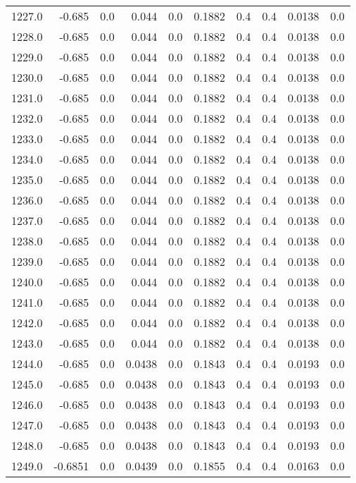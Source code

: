 \begin{longtable}{lrrrrrrrrr}
1227.0 & -0.685 & 0.0 & 0.044 & 0.0 & 0.1882 & 0.4 & 0.4 & 0.0138 & 0.0 \\
1228.0 & -0.685 & 0.0 & 0.044 & 0.0 & 0.1882 & 0.4 & 0.4 & 0.0138 & 0.0 \\
1229.0 & -0.685 & 0.0 & 0.044 & 0.0 & 0.1882 & 0.4 & 0.4 & 0.0138 & 0.0 \\
1230.0 & -0.685 & 0.0 & 0.044 & 0.0 & 0.1882 & 0.4 & 0.4 & 0.0138 & 0.0 \\
1231.0 & -0.685 & 0.0 & 0.044 & 0.0 & 0.1882 & 0.4 & 0.4 & 0.0138 & 0.0 \\
1232.0 & -0.685 & 0.0 & 0.044 & 0.0 & 0.1882 & 0.4 & 0.4 & 0.0138 & 0.0 \\
1233.0 & -0.685 & 0.0 & 0.044 & 0.0 & 0.1882 & 0.4 & 0.4 & 0.0138 & 0.0 \\
1234.0 & -0.685 & 0.0 & 0.044 & 0.0 & 0.1882 & 0.4 & 0.4 & 0.0138 & 0.0 \\
1235.0 & -0.685 & 0.0 & 0.044 & 0.0 & 0.1882 & 0.4 & 0.4 & 0.0138 & 0.0 \\
1236.0 & -0.685 & 0.0 & 0.044 & 0.0 & 0.1882 & 0.4 & 0.4 & 0.0138 & 0.0 \\
1237.0 & -0.685 & 0.0 & 0.044 & 0.0 & 0.1882 & 0.4 & 0.4 & 0.0138 & 0.0 \\
1238.0 & -0.685 & 0.0 & 0.044 & 0.0 & 0.1882 & 0.4 & 0.4 & 0.0138 & 0.0 \\
1239.0 & -0.685 & 0.0 & 0.044 & 0.0 & 0.1882 & 0.4 & 0.4 & 0.0138 & 0.0 \\
1240.0 & -0.685 & 0.0 & 0.044 & 0.0 & 0.1882 & 0.4 & 0.4 & 0.0138 & 0.0 \\
1241.0 & -0.685 & 0.0 & 0.044 & 0.0 & 0.1882 & 0.4 & 0.4 & 0.0138 & 0.0 \\
1242.0 & -0.685 & 0.0 & 0.044 & 0.0 & 0.1882 & 0.4 & 0.4 & 0.0138 & 0.0 \\
1243.0 & -0.685 & 0.0 & 0.044 & 0.0 & 0.1882 & 0.4 & 0.4 & 0.0138 & 0.0 \\
1244.0 & -0.685 & 0.0 & 0.0438 & 0.0 & 0.1843 & 0.4 & 0.4 & 0.0193 & 0.0 \\
1245.0 & -0.685 & 0.0 & 0.0438 & 0.0 & 0.1843 & 0.4 & 0.4 & 0.0193 & 0.0 \\
1246.0 & -0.685 & 0.0 & 0.0438 & 0.0 & 0.1843 & 0.4 & 0.4 & 0.0193 & 0.0 \\
1247.0 & -0.685 & 0.0 & 0.0438 & 0.0 & 0.1843 & 0.4 & 0.4 & 0.0193 & 0.0 \\
1248.0 & -0.685 & 0.0 & 0.0438 & 0.0 & 0.1843 & 0.4 & 0.4 & 0.0193 & 0.0 \\
1249.0 & -0.6851 & 0.0 & 0.0439 & 0.0 & 0.1855 & 0.4 & 0.4 & 0.0163 & 0.0 \\

\end{longtable}
